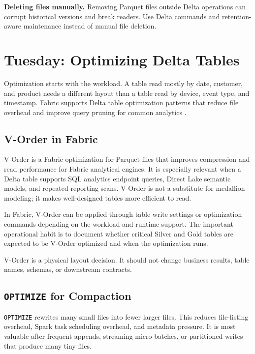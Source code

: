 \begin{pitfall}
\textbf{Deleting files manually.} Removing Parquet files outside Delta operations can corrupt historical versions and break readers. Use Delta commands and retention-aware maintenance instead of manual file deletion.
\end{pitfall}

\section{Tuesday: Optimizing Delta Tables}
Optimization starts with the workload. A table read mostly by date, customer, and product needs a different layout than a table read by device, event type, and timestamp. Fabric supports Delta table optimization patterns that reduce file overhead and improve query pruning for common analytics \cite{microsoftFabricVOrder,microsoftFabricOptimize}.

\subsection{V-Order in Fabric}
V-Order is a Fabric optimization for Parquet files that improves compression and read performance for Fabric analytical engines. It is especially relevant when a Delta table supports SQL analytics endpoint queries, Direct Lake semantic models, and repeated reporting scans. V-Order is not a substitute for medallion modeling; it makes well-designed tables more efficient to read.

In Fabric, V-Order can be applied through table write settings or optimization commands depending on the workload and runtime support. The important operational habit is to document whether critical Silver and Gold tables are expected to be V-Order optimized and when the optimization runs.

\begin{notebox}
V-Order is a physical layout decision. It should not change business results, table names, schemas, or downstream contracts.
\end{notebox}

\subsection{\texttt{OPTIMIZE} for Compaction}
\texttt{OPTIMIZE} rewrites many small files into fewer larger files. This reduces file-listing overhead, Spark task scheduling overhead, and metadata pressure. It is most valuable after frequent appends, streaming micro-batches, or partitioned writes that produce many tiny files.

